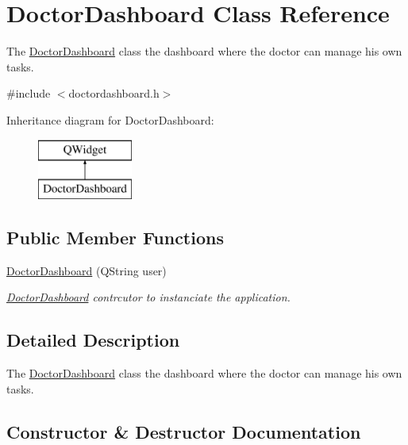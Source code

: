 \hypertarget{class_doctor_dashboard}{}\section{Doctor\+Dashboard Class Reference}
\label{class_doctor_dashboard}


The \mbox{\hyperlink{class_doctor_dashboard}{Doctor\+Dashboard}} class the dashboard where the doctor can manage his own tasks.  




{\ttfamily \#include $<$doctordashboard.\+h$>$}

Inheritance diagram for Doctor\+Dashboard\+:\begin{figure}[H]
\begin{center}
\leavevmode
\includegraphics[height=2.000000cm]{class_doctor_dashboard}
\end{center}
\end{figure}
\subsection*{Public Member Functions}
\begin{DoxyCompactItemize}
\item 
\mbox{\hyperlink{class_doctor_dashboard_aca23b27e7966fd12fc1b34f918e788b3}{Doctor\+Dashboard}} (Q\+String user)
\begin{DoxyCompactList}\small\item\em \mbox{\hyperlink{class_doctor_dashboard}{Doctor\+Dashboard}} contrcutor to instanciate the application. \end{DoxyCompactList}\end{DoxyCompactItemize}


\subsection{Detailed Description}
The \mbox{\hyperlink{class_doctor_dashboard}{Doctor\+Dashboard}} class the dashboard where the doctor can manage his own tasks. 

\subsection{Constructor \& Destructor Documentation}
\mbox{\label{class_doctor_dashboard_aca23b27e7966fd12fc1b34f918e788b3}} 
